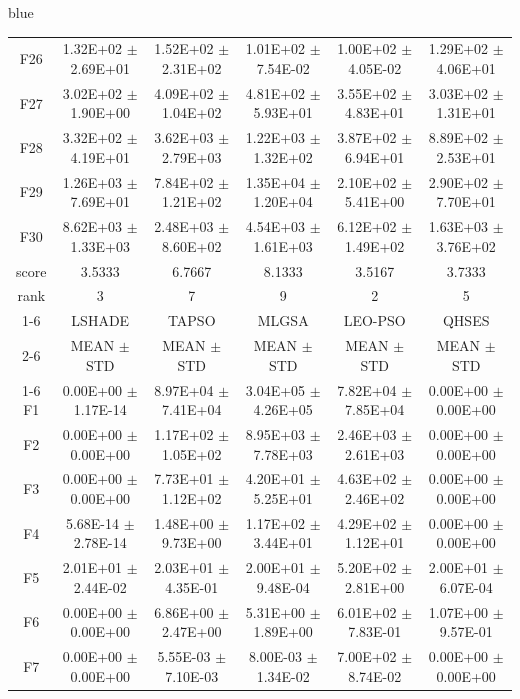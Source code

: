\documentclass[journal, onecolumn]{IEEEtran}
\begin{document}
\begin{color}{blue}
\begin{table}[htbp!]
\begin{tabular}{c|ccccc}
		F26	 &	1.32E+02	$\pm$	2.69E+01	 &	1.52E+02	$\pm$	2.31E+02		 &	1.01E+02	$\pm$	7.54E-02		 &	1.00E+02	$\pm$	4.05E-02		 &	1.29E+02	$\pm$	4.06E+01	\\		
		F27	 &	3.02E+02	$\pm$	1.90E+00	 &	4.09E+02	$\pm$	1.04E+02		 &	4.81E+02	$\pm$	5.93E+01		 &	3.55E+02	$\pm$	4.83E+01		 &	3.03E+02	$\pm$	1.31E+01	\\		
		F28	 &	3.32E+02	$\pm$	4.19E+01	 &	3.62E+03	$\pm$	2.79E+03		 &	1.22E+03	$\pm$	1.32E+02		 &	3.87E+02	$\pm$	6.94E+01		 &	8.89E+02	$\pm$	2.53E+01	\\		
		F29	 &	1.26E+03	$\pm$	7.69E+01	 &	7.84E+02	$\pm$	1.21E+02		 &	1.35E+04	$\pm$	1.20E+04		 &	2.10E+02	$\pm$	5.41E+00		 &	2.90E+02	$\pm$	7.70E+01	\\		
		F30	 &	8.62E+03	$\pm$	1.33E+03	 &	2.48E+03	$\pm$	8.60E+02		 &	4.54E+03	$\pm$	1.61E+03		 &	6.12E+02	$\pm$	1.49E+02		 &	1.63E+03	$\pm$	3.76E+02	\\		\hline
		score		& 3.5333 & 6.7667 & 8.1333 & 3.5167 & 3.7333											\\													
		rank	 	& 3 & 7 & 9 & 2 & 5											\\	\cline{1-6}												
		&	LSHADE				 &	TAPSO				 &	MLGSA				 &	LEO-PSO				 &	QHSES			\\	\cline{2-6}	
		&	MEAN	$\pm$	STD		 &	MEAN	$\pm$	STD		 &	MEAN	$\pm$	STD		 &	MEAN	$\pm$	STD		 &	MEAN	$\pm$	STD	\\	\cline{1-6}
		F1	 &	0.00E+00	$\pm$	1.17E-14		 &	8.97E+04	$\pm$	7.41E+04		 &	3.04E+05	$\pm$	4.26E+05		 &	7.82E+04	$\pm$	7.85E+04		 &	0.00E+00	$\pm$	0.00E+00	\\	
		F2	 &	0.00E+00	$\pm$	0.00E+00		 &	1.17E+02	$\pm$	1.05E+02		 &	8.95E+03	$\pm$	7.78E+03		 &	2.46E+03	$\pm$	2.61E+03		 &	0.00E+00	$\pm$	0.00E+00	\\	
		F3	 &	0.00E+00	$\pm$	0.00E+00		 &	7.73E+01	$\pm$	1.12E+02		 &	4.20E+01	$\pm$	5.25E+01		 &	4.63E+02	$\pm$	2.46E+02		 &	0.00E+00	$\pm$	0.00E+00	\\	
		F4	 &	5.68E-14	$\pm$	2.78E-14		 &	1.48E+00	$\pm$	9.73E+00		 &	1.17E+02	$\pm$	3.44E+01		 &	4.29E+02	$\pm$	1.12E+01		 &	0.00E+00	$\pm$	0.00E+00	\\	
		F5	 &	2.01E+01	$\pm$	2.44E-02		 &	2.03E+01	$\pm$	4.35E-01		 &	2.00E+01	$\pm$	9.48E-04		 &	5.20E+02	$\pm$	2.81E+00		 &	2.00E+01	$\pm$	6.07E-04	\\	
		F6	 &	0.00E+00	$\pm$	0.00E+00		 &	6.86E+00	$\pm$	2.47E+00		 &	5.31E+00	$\pm$	1.89E+00		 &	6.01E+02	$\pm$	7.83E-01		 &	1.07E+00	$\pm$	9.57E-01	\\	
		F7	 &	0.00E+00	$\pm$	0.00E+00		 &	5.55E-03	$\pm$	7.10E-03		 &	8.00E-03	$\pm$	1.34E-02		 &	7.00E+02	$\pm$	8.74E-02		 &	0.00E+00	$\pm$	0.00E+00	\\	

\end{tabular}
\end{table}
\end{color}
\end{document}
